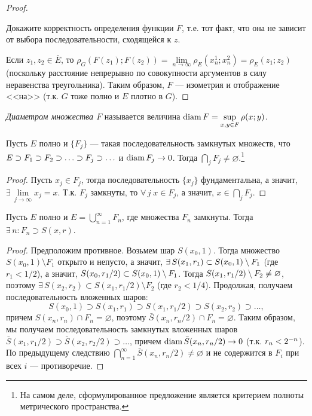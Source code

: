 \documentclass[12pt,titlepage, a4paper]{article}
\begin{document}
\begin{proof}
\begin{upr}
Докажите корректность определения функции $F$, т.е. тот факт, что
она не зависит от выбора последовательности, сходящейся к $z$.
\end{upr}

Если $z_1,z_2\in\bar{E}$, то
$\rho_G(F(z_1);F(z_2))=\lim\limits_{n\to\infty}\rho_E(x_n^1;x_n^2)=\rho_E(z_1;z_2)$
(поскольку расстояние непрерывно по совокупности аргументов в силу
неравенства треугольника). Таким образом, $F$ --- изометрия и
отображение <<на>> (т.к. $G$ тоже полно и $E$ плотно в $G$).
\end{proof}

\begin{defen}
\emph{Диаметром множества $F$} называется величина $\mathop{\mathrm{diam}}
F=\sup\limits_{x,y\in F}\rho(x;y)$.
\end{defen}

\begin{theorem}
Пусть $E$ полно и $\{F_j\}$ --- такая последовательность замкнутых
множеств, что $E\supset F_1\p\supset F_2\supset\ldots\supset
F_j\supset\ldots$ и $\mathop{\mathrm{diam}} F_j\to 0$. Тогда $\bigcap\limits_j
F_j\neq\varnothing$.\footnote{На самом деле, сформулированное
предложение является критерием полноты метрического пространства.}
\end{theorem}

\begin{proof}
Пусть $x_j\in F_j$, тогда последовательность $\{x_j\}$
фундаментальна, а значит, $\exists\,\lim\limits_{j\to\infty}x_j=x$.
Т.к. $F_j$ замкнуты, то $\forall\, j\;x\in F_j$, а значит,
$x\in\bigcap\limits_j F_j$.
\end{proof}

\begin{theorem}[Бэр]\label{th.Ber}
Пусть $E$ полно и $E=\bigcup\limits_{n=1}^\infty F_n$, где множества
$F_n$ замкнуты. Тогда $\exists\,n:F_n\supset S(x,r)$.
\end{theorem}

\begin{proof}
Предположим противное. Возьмем шар $S(x_0,1)$. Тогда множество
$S(x_0,1)\setminus F_1$ открыто и непусто, а значит, $\exists\,
S(x_1,r_1)\subset S(x_0,1)\p\setminus F_1$ (где $r_1<1/2$), а
значит, $S(x_0,r_1/2)\subset S(x_0,1)\p\setminus F_1$. Тогда
$S(x_1,r_1/2)\p\setminus F_2\neq\varnothing$, поэтому
$\exists\,S(x_2,r_2)\subset S(x_1,r_1/2)\setminus F_2$ (где
$r_2<1/4$). Продолжая, получаем последовательность вложенных шаров:
$$S(x_0,1)\supset S(x_1,r_1)\supset S(x_1,r_1/2)\supset
S(x_2,r_2)\supset\ldots,$$ причем $S(x_n,r_n)\cap F_n=\varnothing$,
поэтому $\bar{S}(x_n,r_n/2)\cap F_n=\varnothing$. Таким образом, мы
получаем последовательность замкнутых вложенных шаров
$\bar{S}(x_1,r_1/2)\supset \bar{S}(x_2,r_2/2)\supset \ldots$, причем
$\mathop{\mathrm{diam}} \bar{S}(x_n,r_n/2)\to0$ (т.к. $r_n\p<2^{-n}$). По предыдущему
следствию $\bigcap\limits_{n=1}^\infty
\bar{S}(x_n,r_n/2)\neq\varnothing$ и не содержится в $F_i$ при всех
$i$ --- противоречие.
\end{proof}
\end{document}
